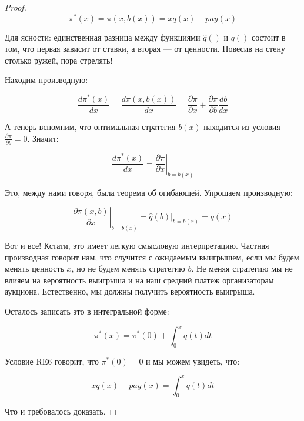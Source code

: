 \begin{proof}
\[ \pi^{*}(x)=\pi(x,b(x))=xq(x)-pay(x) \]

Для ясности: единственная разница между функциями $ \widehat{q}() $ и $ q() $ состоит в том, что первая зависит от ставки, а вторая --- от ценности. Повесив на стену столько ружей, пора стрелять!

Находим производную:

\begin{equation}
\frac{d \pi^{*}(x)}{dx}=\frac{d \pi(x,b(x))}{dx}=\frac{\partial \pi}{\partial x}+\frac{\partial \pi}{\partial b}\frac{d b }{d x}
\end{equation}

А теперь вспомним, что оптимальная стратегия $ b(x) $ находится из условия $ \frac{\partial \pi}{\partial b}=0 $. Значит:

\begin{equation}
\frac{d \pi^{*}(x)}{dx}=\left.\frac{\partial \pi}{\partial x}\right|_{b=b(x)}
\end{equation}

Это, между нами говоря, была теорема об огибающей. Упрощаем производную:

\begin{equation}
\left.\frac{\partial \pi(x,b)}{\partial x}\right|_{b=b(x)}=\widehat{q}(b)|_{b=b(x)}=q(x)
\end{equation}

Вот и все! Кстати, это имеет легкую смысловую интерпретацию. Частная производная говорит нам, что случится с ожидаемым выигрышем, если мы будем менять ценность $x$, но не будем менять стратегию $ b $. Не меняя стратегию мы не влияем на вероятность выигрыша и на наш средний платеж организаторам аукциона. Естественно, мы должны получить вероятность выигрыша.

Осталось записать это в интегральной форме:

\begin{equation}
\pi^{*}(x)=\pi^{*}(0)+\int_{0}^{x}q(t)dt
\end{equation}

Условие RE6 говорит, что $ \pi^{*}(0)=0 $ и мы можем увидеть, что:

\begin{equation}
xq(x)-pay(x)=\int_{0}^{x}q(t)dt
\end{equation}

Что и требовалось доказать.
\end{proof}

